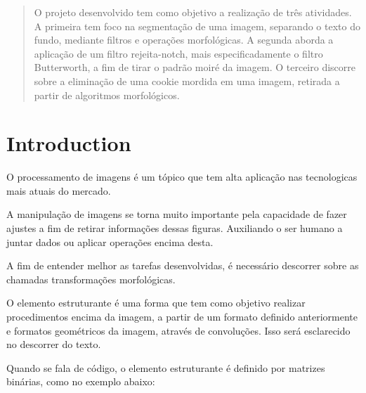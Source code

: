 \documentclass[conference]{IEEEtran}
\begin{document}
\begin{abstract}
O projeto desenvolvido tem como objetivo a realização de três atividades.
A primeira tem foco na segmentação de uma imagem, separando o texto do fundo, mediante filtros e operações morfológicas.
A segunda aborda a aplicação de um filtro rejeita-notch, mais especificadamente o filtro Butterworth, a fim de tirar o padrão
moiré da imagem. 
O terceiro discorre sobre a eliminação de uma cookie mordida em uma imagem, retirada a partir de
algoritmos morfológicos.
\end{abstract}











%
\IEEEpeerreviewmaketitle



\section{Introduction}
O processamento de imagens é um tópico que tem alta aplicação nas tecnologicas mais
atuais do mercado.

A manipulação de imagens se torna muito importante pela capacidade de fazer ajustes
a fim de retirar informações dessas figuras. Auxiliando o ser humano a juntar dados 
ou aplicar operações encima desta.

A fim de entender melhor as tarefas desenvolvidas, é necessário descorrer sobre
as chamadas transformações morfológicas.

O elemento estruturante é uma forma que tem como objetivo realizar procedimentos
encima da imagem, a partir de um formato definido anteriormente e formatos geométricos da imagem, através de convoluções. Isso será esclarecido no descorrer
do texto.

Quando se fala de código, o elemento estruturante é definido por matrizes binárias, como no exemplo abaixo:
\end{document}
